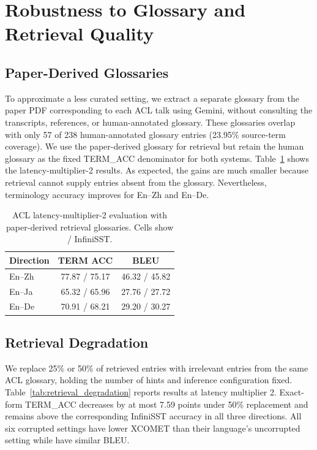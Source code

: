 \section{\texorpdfstring{Robustness to Glossary and Retrieval Quality}{Robustness to Glossary and Retrieval Quality}}
\label{sec:robustness_analysis}

\subsection{\texorpdfstring{Paper-Derived Glossaries}{Paper-Derived Glossaries}}

To approximate a less curated setting, we extract a separate glossary from the paper PDF corresponding to each ACL talk using Gemini, without consulting the transcripts, references, or human-annotated glossary. These glossaries overlap with only 57 of 238 human-annotated glossary entries (23.95\% source-term coverage). We use the paper-derived glossary for \method retrieval but retain the human glossary as the fixed TERM\_ACC denominator for both systems. Table~\ref{tab:paper_glossary} shows the latency-multiplier-2 results. As expected, the gains are much smaller because retrieval cannot supply entries absent from the glossary. Nevertheless, terminology accuracy improves for En--Zh and En--De. 

\begin{table}[t]
\centering
\setlength{\tabcolsep}{3pt}
\begin{tabular}{lcc}
\toprule
Direction & TERM ACC & BLEU \\
\midrule
En--Zh & 77.87 / 75.17 & 46.32 / 45.82 \\
En--Ja & 65.32 / 65.96 & 27.76 / 27.72 \\
En--De & 70.91 / 68.21 & 29.20 / 30.27 \\
\bottomrule
\end{tabular}
\caption{ACL latency-multiplier-2 evaluation with paper-derived retrieval glossaries. Cells show \method / InfiniSST.}
\label{tab:paper_glossary}
\end{table}

\subsection{\texorpdfstring{Retrieval Degradation}{Retrieval Degradation}}

We replace 25\% or 50\% of retrieved entries with irrelevant entries from the same ACL glossary, holding the number of hints and inference configuration fixed. Table~\ref{tab:retrieval_degradation} reports results at latency multiplier 2. Exact-form TERM\_ACC decreases by at most 7.59 points under 50\% replacement and remains above the corresponding InfiniSST accuracy in all three directions. All six corrupted settings have lower XCOMET than their language's uncorrupted setting while have similar BLEU.

